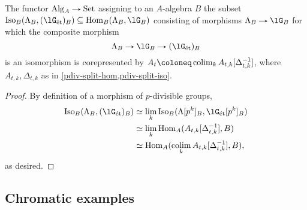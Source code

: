 \begin{proposition}
  \label{pdiv-split-main}
  The functor $\Alg_A \to \Set$ assigning to an $A$-algebra $B$ the
  subset
  $\Iso_B(\Lambda_B, (\lG_\et)_B) \subseteq
  \Hom_B(\Lambda_B, \lG_B)$
  consisting of morphisms $\Lambda_B \to \lG_B$ for which
  the composite morphism
  \[
  \Lambda_B \to \lG_B \to (\lG_\et)_B
  \]
  is an isomorphism is corepresented by
  $A_t \ce \colim_k A_{t,k}[\Delta_{t,k}^{-1}]$, where
  $A_{t,k}, \Delta_{t,k}$ as in \cref{pdiv-split-hom,pdiv-split-iso}.
\end{proposition}

\begin{proof}
  By definition of a morphism of $p$-divisible groups,
  \begin{align*}
    \Iso_B(\Lambda_B, (\lG_\et)_B) &\iso
    \lim_k \Iso_B(\Lambda[p^k]_B, \lG_\et[p^k]_B) \\ &\iso
    \lim_k \Hom_A(A_{t,k}[\Delta_{t,k}^{-1}], B) \\ &\iso
    \Hom_A(\colim_k A_{t,k}[\Delta_{t,k}^{-1}], B),
  \end{align*}
  as desired.
\end{proof}


\subsection{Chromatic examples}
\label{pdiv-chromex}